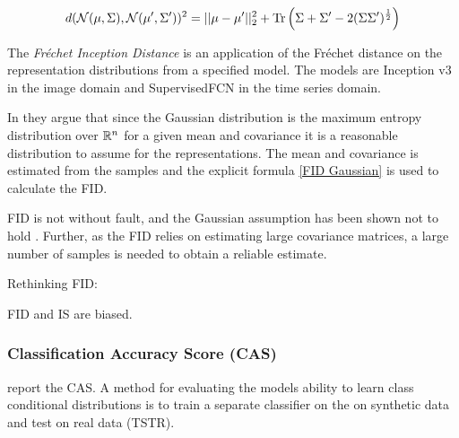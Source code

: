 \documentclass[../../thesis.tex]{subfiles}
\begin{document}
\begin{equation}
    \label{eq:FID Gaussian}
    d(\mathcal{N}(\mu,\Sigma),\mathcal{N}(\mu',\Sigma'))^2 = ||\mu-\mu'||_2^2 + \operatorname{Tr} \left( \Sigma + \Sigma' - 2(\Sigma\Sigma')^{\frac12}\right)
\end{equation}

The \textit{Fréchet Inception Distance} is an application of the Fréchet distance on the representation distributions from a specified model. The models are Inception v3 in the image domain and SupervisedFCN in the time series domain.\newline

In \cite{heusel2018gans} they argue that since the Gaussian distribution is the maximum entropy distribution over $\mathbb{R}^n$ for a given mean and covariance it is a reasonable distribution to assume for the representations. The mean and covariance is estimated from the samples and the explicit formula \ref{FID Gaussian} is used to calculate the FID. \newline

FID is not without fault, and the Gaussian assumption has been shown not to hold \cite{jayasumana2024rethinking}. Further, as the FID relies on estimating large covariance matrices, a large number of samples is needed to obtain a reliable estimate.\newline

Rethinking FID: \cite{jayasumana2024rethinking} 

\cite{chong2020effectively} FID and IS are biased.


\subsubsection{Classification Accuracy Score (CAS)}
\cite{smith2020conditional} report the CAS.
A method for evaluating the models ability to learn class conditional distributions is to train a separate classifier on the on synthetic data and test on real data (TSTR).  
\end{document}
